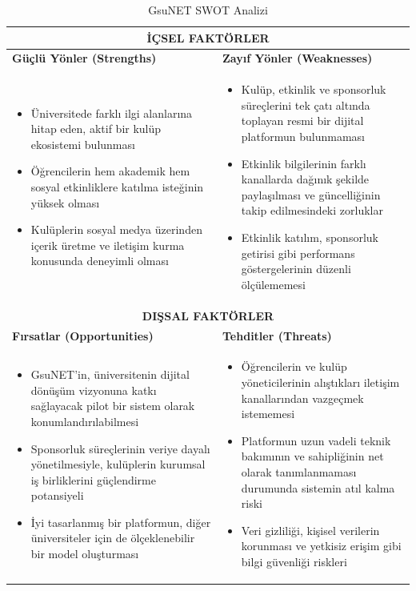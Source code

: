 \documentclass[a4paper,12pt]{report}
\begin{document}
\begin{table}[h]
\centering
\begin{tabular}{|p{7cm}|p{7cm}|}
\hline
\multicolumn{2}{|c|}{\textbf{İÇSEL FAKTÖRLER}} \\
\hline
\textbf{Güçlü Yönler (Strengths)} & \textbf{Zayıf Yönler (Weaknesses)} \\
\hline
\begin{itemize}[leftmargin=*]
    \item Üniversitede farklı ilgi alanlarına hitap eden, aktif bir kulüp ekosistemi bulunması
    \item Öğrencilerin hem akademik hem sosyal etkinliklere katılma isteğinin yüksek olması
    \item Kulüplerin sosyal medya üzerinden içerik üretme ve iletişim kurma konusunda deneyimli olması
\end{itemize}
&
\begin{itemize}[leftmargin=*]
    \item Kulüp, etkinlik ve sponsorluk süreçlerini tek çatı altında toplayan resmi bir dijital platformun bulunmaması
    \item Etkinlik bilgilerinin farklı kanallarda dağınık şekilde paylaşılması ve güncelliğinin takip edilmesindeki zorluklar
    \item Etkinlik katılım, sponsorluk getirisi gibi performans göstergelerinin düzenli ölçülememesi
\end{itemize}
\\
\hline
\multicolumn{2}{|c|}{\textbf{DIŞSAL FAKTÖRLER}} \\
\hline
\textbf{Fırsatlar (Opportunities)} & \textbf{Tehditler (Threats)} \\
\hline
\begin{itemize}[leftmargin=*]
    \item GsuNET'in, üniversitenin dijital dönüşüm vizyonuna katkı sağlayacak pilot bir sistem olarak konumlandırılabilmesi
    \item Sponsorluk süreçlerinin veriye dayalı yönetilmesiyle, kulüplerin kurumsal iş birliklerini güçlendirme potansiyeli
    \item İyi tasarlanmış bir platformun, diğer üniversiteler için de ölçeklenebilir bir model oluşturması
\end{itemize}
&
\begin{itemize}[leftmargin=*]
    \item Öğrencilerin ve kulüp yöneticilerinin alıştıkları iletişim kanallarından vazgeçmek istememesi
    \item Platformun uzun vadeli teknik bakımının ve sahipliğinin net olarak tanımlanmaması durumunda sistemin atıl kalma riski
    \item Veri gizliliği, kişisel verilerin korunması ve yetkisiz erişim gibi bilgi güvenliği riskleri
\end{itemize}
\\
\hline
\end{tabular}
\caption{GsuNET SWOT Analizi}
\end{table}
\end{document}
